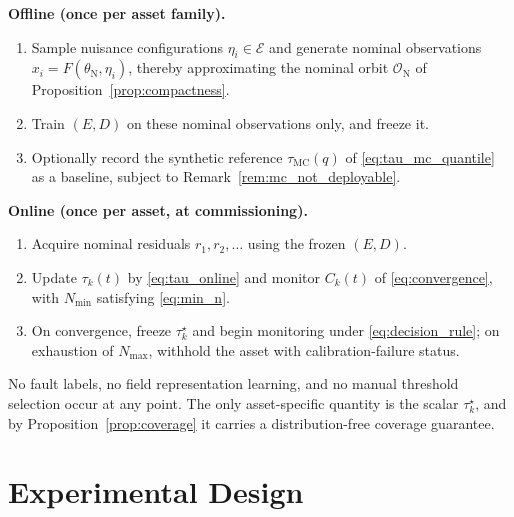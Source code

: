 \documentclass[a4paper]{cas-sc}
\newcommand{\EtaSpace}{\ensuremath{\mathcal{E}}}
\newcommand{\residual}{\ensuremath{r}}
\newcommand{\taumc}{\ensuremath{\tau_{\mathrm{MC}}}}
\begin{document}
\noindent\textbf{Offline (once per asset family).}
\begin{enumerate}[leftmargin=1.8em]
\item Sample nuisance configurations \(\eta_i\in\EtaSpace\) and generate
      nominal observations \(x_i=F(\theta_{\mathrm{N}},\eta_i)\), thereby
      approximating the nominal orbit \(\mathcal{O}_{\mathrm N}\) of
      Proposition~\ref{prop:compactness}.
\item Train \((E,D)\) on these nominal observations only, and freeze it.
\item Optionally record the synthetic reference \(\taumc(q)\) of
      \eqref{eq:tau_mc_quantile} as a baseline, subject to
      Remark~\ref{rem:mc_not_deployable}.
\end{enumerate}

\noindent\textbf{Online (once per asset, at commissioning).}
\begin{enumerate}[leftmargin=1.8em]
\item Acquire nominal residuals \(\residual_1,\residual_2,\ldots\) using
      the frozen \((E,D)\).
\item Update \(\tau_k(t)\) by \eqref{eq:tau_online} and monitor
      \(C_k(t)\) of \eqref{eq:convergence}, with
      \(N_{\min}\) satisfying \eqref{eq:min_n}.
\item On convergence, freeze \(\tau_k^\star\) and begin monitoring under
      \eqref{eq:decision_rule}; on exhaustion of \(N_{\max}\), withhold the
      asset with calibration-failure status.
\end{enumerate}

No fault labels, no field representation learning, and no manual threshold
selection occur at any point. The only asset-specific quantity is the
scalar \(\tau_k^\star\), and by Proposition~\ref{prop:coverage} it carries
a distribution-free coverage guarantee.

\section{Experimental Design}
\label{sec:experimental_design}
\end{document}
